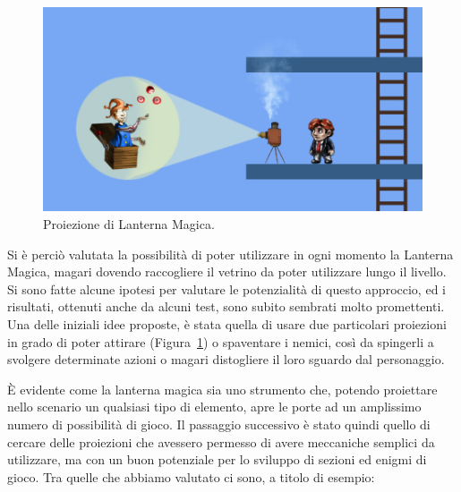 \begin{figure}%
	\centering
	\includegraphics[width= 0.85\columnwidth]{images/gameDesign/17_giocoliere.jpg}
	\caption{Proiezione di Lanterna Magica.}
	\label{fig:meccaniche_precinema_lanterna01}
\end{figure}

Si è perciò valutata la possibilità di poter utilizzare in ogni momento la Lanterna Magica, magari dovendo raccogliere il vetrino da poter utilizzare lungo il livello. Si sono fatte alcune ipotesi per valutare le potenzialità di questo approccio, ed i risultati, ottenuti anche da alcuni test, sono subito sembrati molto promettenti.
Una delle iniziali idee proposte, è stata quella di usare due particolari proiezioni in grado di poter attirare (Figura~\ref{fig:meccaniche_precinema_lanterna01}) o spaventare i nemici, così da spingerli a svolgere determinate azioni o magari distogliere il loro sguardo dal personaggio.



È evidente come la lanterna magica sia uno strumento che, potendo proiettare nello scenario un qualsiasi tipo di elemento, apre le porte ad un amplissimo numero di possibilità di gioco.
Il passaggio successivo è stato quindi quello di cercare delle proiezioni che avessero permesso di avere meccaniche semplici da utilizzare, ma con un buon potenziale per lo sviluppo di sezioni ed enigmi di gioco. Tra quelle che abbiamo valutato ci sono, a titolo di esempio:

